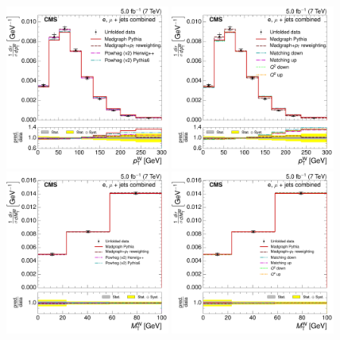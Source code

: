 \begin{figure}[hbtp]
    \centering
     \includegraphics[width=0.48\textwidth]{Chapters/07_08_09_Analysis/Images/results/fit/7TeV/WPT/central/normalised_xsection_combined_different_generators.pdf}\hfill
     \includegraphics[width=0.48\textwidth]{Chapters/07_08_09_Analysis/Images/results/fit/7TeV/WPT/central/normalised_xsection_combined_systematics_shifts.pdf}\hfill
     \includegraphics[width=0.48\textwidth]{Chapters/07_08_09_Analysis/Images/results/fit/7TeV/MT/central/normalised_xsection_combined_different_generators.pdf}\hfill
     \includegraphics[width=0.48\textwidth]{Chapters/07_08_09_Analysis/Images/results/fit/7TeV/MT/central/normalised_xsection_combined_systematics_shifts.pdf}\hfill

\end{figure}
